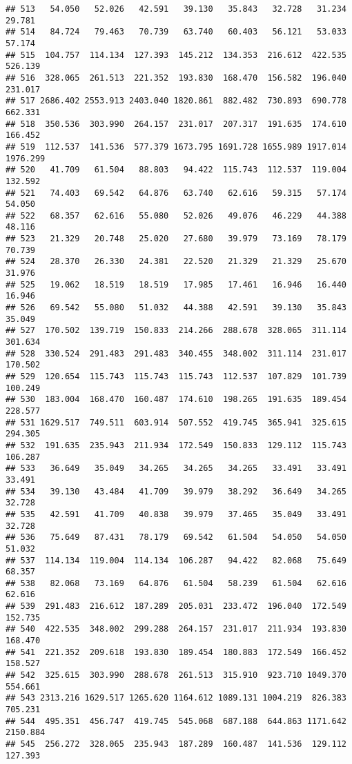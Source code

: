 \documentclass[
]{article}
\begin{document}
\begin{verbatim}
## 513   54.050   52.026   42.591   39.130   35.843   32.728   31.234   29.781
## 514   84.724   79.463   70.739   63.740   60.403   56.121   53.033   57.174
## 515  104.757  114.134  127.393  145.212  134.353  216.612  422.535  526.139
## 516  328.065  261.513  221.352  193.830  168.470  156.582  196.040  231.017
## 517 2686.402 2553.913 2403.040 1820.861  882.482  730.893  690.778  662.331
## 518  350.536  303.990  264.157  231.017  207.317  191.635  174.610  166.452
## 519  112.537  141.536  577.379 1673.795 1691.728 1655.989 1917.014 1976.299
## 520   41.709   61.504   88.803   94.422  115.743  112.537  119.004  132.592
## 521   74.403   69.542   64.876   63.740   62.616   59.315   57.174   54.050
## 522   68.357   62.616   55.080   52.026   49.076   46.229   44.388   48.116
## 523   21.329   20.748   25.020   27.680   39.979   73.169   78.179   70.739
## 524   28.370   26.330   24.381   22.520   21.329   21.329   25.670   31.976
## 525   19.062   18.519   18.519   17.985   17.461   16.946   16.440   16.946
## 526   69.542   55.080   51.032   44.388   42.591   39.130   35.843   35.049
## 527  170.502  139.719  150.833  214.266  288.678  328.065  311.114  301.634
## 528  330.524  291.483  291.483  340.455  348.002  311.114  231.017  170.502
## 529  120.654  115.743  115.743  115.743  112.537  107.829  101.739  100.249
## 530  183.004  168.470  160.487  174.610  198.265  191.635  189.454  228.577
## 531 1629.517  749.511  603.914  507.552  419.745  365.941  325.615  294.305
## 532  191.635  235.943  211.934  172.549  150.833  129.112  115.743  106.287
## 533   36.649   35.049   34.265   34.265   34.265   33.491   33.491   33.491
## 534   39.130   43.484   41.709   39.979   38.292   36.649   34.265   32.728
## 535   42.591   41.709   40.838   39.979   37.465   35.049   33.491   32.728
## 536   75.649   87.431   78.179   69.542   61.504   54.050   54.050   51.032
## 537  114.134  119.004  114.134  106.287   94.422   82.068   75.649   68.357
## 538   82.068   73.169   64.876   61.504   58.239   61.504   62.616   62.616
## 539  291.483  216.612  187.289  205.031  233.472  196.040  172.549  152.735
## 540  422.535  348.002  299.288  264.157  231.017  211.934  193.830  168.470
## 541  221.352  209.618  193.830  189.454  180.883  172.549  166.452  158.527
## 542  325.615  303.990  288.678  261.513  315.910  923.710 1049.370  554.661
## 543 2313.216 1629.517 1265.620 1164.612 1089.131 1004.219  826.383  705.231
## 544  495.351  456.747  419.745  545.068  687.188  644.863 1171.642 2150.884
## 545  256.272  328.065  235.943  187.289  160.487  141.536  129.112  127.393

\end{verbatim}
\end{document}
